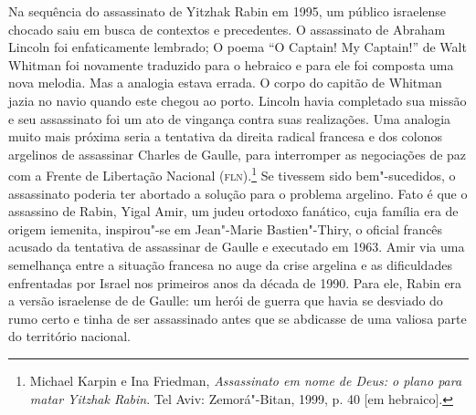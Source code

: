 Na sequência do assassinato de Yitzhak Rabin em 1995, um público
israelense chocado saiu em busca de contextos e precedentes. O
assassinato de Abraham Lincoln foi enfaticamente lembrado; O poema ``O
Captain! My Captain!'' de Walt Whitman foi novamente traduzido para o
hebraico e para ele foi composta uma nova melodia. Mas a analogia estava
errada. O corpo do capitão de Whitman jazia no navio quando este chegou
ao porto. Lincoln havia completado sua missão e seu assassinato foi um
ato de vingança contra suas realizações. Uma analogia muito mais próxima
seria a tentativa da direita radical francesa e dos colonos argelinos de
assassinar Charles de Gaulle, para interromper as negociações de paz com
a Frente de Libertação Nacional (\textsc{fln}).\footnote{Michael Karpin e Ina Friedman, \emph{Assassinato em nome de Deus: o plano para matar
Yitzhak Rabin}. Tel Aviv: Zemorá"-Bitan, 1999, p. 40 {[}em hebraico{]}.} Se tivessem sido bem"-sucedidos,
o assassinato poderia ter abortado a solução para o problema
argelino. Fato é que o assassino de Rabin, Yigal Amir, um judeu ortodoxo
fanático, cuja família era de origem iemenita, inspirou"-se em Jean"-Marie
Bastien"-Thiry, o oficial francês acusado da tentativa de assassinar de Gaulle e executado em 1963. 
Amir via uma semelhança entre a situação
francesa no auge da crise argelina e as dificuldades enfrentadas por
Israel nos primeiros anos da década de 1990. Para ele, Rabin era a
versão israelense de de Gaulle: um herói de guerra que havia se desviado
do rumo certo e tinha de ser assassinado antes que se abdicasse de uma
valiosa parte do território nacional.

